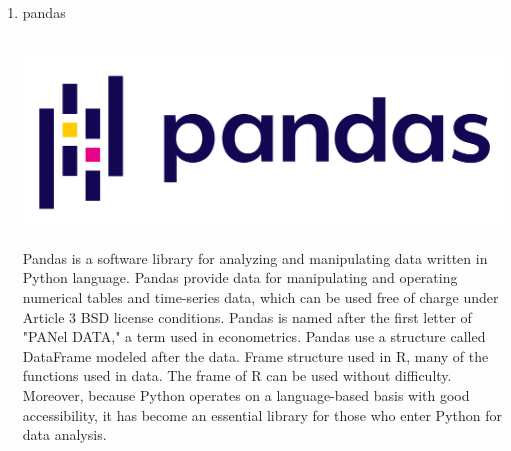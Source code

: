\documentclass[conference]{IEEEtran}
\begin{document}
\begin{enumerate}
    \break
    
    \item pandas \\ \\
    \centerline{\includegraphics[scale=0.2]{assets/pandas.PNG}}
    Pandas is a software library for analyzing and manipulating data written in Python language. Pandas provide data for manipulating and operating numerical tables and time-series data, which can be used free of charge under Article 3 BSD license conditions. Pandas is named after the first letter of "PANel DATA," a term used in econometrics. Pandas use a structure called DataFrame modeled after the data. Frame structure used in R, many of the functions used in data. The frame of R can be used without difficulty. Moreover, because Python operates on a language-based basis with good accessibility, it has become an essential library for those who enter Python for data analysis. \\ \\ \\ \\ \\ \\ \\ \\ \\ \\ \\
    

\end{enumerate}
\end{document}
